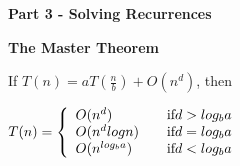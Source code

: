 {\bf Part 3 - Solving Recurrences}

{\bf The Master Theorem}

If $T(n) = aT(\frac{n}{b}) + O(n^d)$, then

\begin{math}
T(n) = \left\{
\begin{array}{l l}
O(n^d)       & \quad \text{if} d > log_ba \\
O(n^d logn)  & \quad \text{if} d = log_ba \\
O(n^{log_ba}) & \quad \text{if} d < log_ba \\
\end{array} \right.
\end{math}
